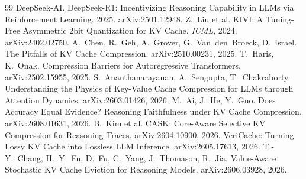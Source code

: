 \documentclass{article}
\begin{document}
\begin{thebibliography}{99}
 DeepSeek-AI. DeepSeek-R1: Incentivizing Reasoning Capability in LLMs via Reinforcement Learning. 2025. arXiv:2501.12948.
 Z.~Liu et al. KIVI: A Tuning-Free Asymmetric 2bit Quantization for KV Cache. \emph{ICML}, 2024. arXiv:2402.02750.
 A.~Chen, R.~Geh, A.~Grover, G.~Van~den~Broeck, D.~Israel. The Pitfalls of KV Cache Compression. arXiv:2510.00231, 2025.
 T.~Haris, K.~Onak. Compression Barriers for Autoregressive Transformers. arXiv:2502.15955, 2025.
 S.~Ananthanarayanan, A.~Sengupta, T.~Chakraborty. Understanding the Physics of Key-Value Cache Compression for LLMs through Attention Dynamics. arXiv:2603.01426, 2026.
 M.~Ai, J.~He, Y.~Guo. Does Accuracy Equal Evidence? Reasoning Faithfulness under KV Cache Compression. arXiv:2608.01631, 2026.
 B.~Kim et al. CASK: Core-Aware Selective KV Compression for Reasoning Traces. arXiv:2604.10900, 2026.
 VeriCache: Turning Lossy KV Cache into Lossless LLM Inference. arXiv:2605.17613, 2026.
 T.-Y.~Chang, H.~Y.~Fu, D.~Fu, C.~Yang, J.~Thomason, R.~Jia. Value-Aware Stochastic KV Cache Eviction for Reasoning Models. arXiv:2606.03928, 2026.
\end{thebibliography}
\end{document}
